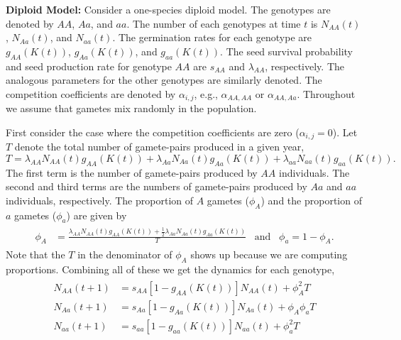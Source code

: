 \documentclass[11pt]{article}
\begin{document}
\noindent \textbf{Diploid Model:} Consider a one-species diploid model.  The genotypes are denoted by $AA$, $Aa$, and $aa$.   The number of each genotypes at time $t$ is $N_{AA}(t)$, $N_{Aa}(t)$, and $N_{aa}(t)$.  The germination rates for each genotype are $g_{AA}(K(t))$, $g_{Aa}(K(t))$, and $g_{aa}(K(t))$.  The seed survival probability and seed production rate for genotype $AA$ are $s_{AA}$ and $\lambda_{AA}$, respectively.  The analogous parameters for the other genotypes are similarly denoted.  The competition coefficients are denoted by $\alpha_{i,j}$, e.g., $\alpha_{AA,AA}$ or $\alpha_{AA,Aa}$.  Throughout we assume that gametes mix randomly in the population.  

First consider the case where the competition coefficients are zero ($\alpha_{i,j}=0$).  Let $T$ denote the total number of gamete-pairs produced in a given year,
\begin{equation}
T = \lambda_{AA}N_{AA}(t)g_{AA}(K(t))+ \lambda_{Aa}N_{Aa}(t)g_{Aa}(K(t))+\lambda_{aa}N_{aa}(t)g_{aa}(K(t)).
\end{equation}
The first term is the number of gamete-pairs produced by $AA$ individuals.  The second and third terms are the numbers of gamete-pairs produced by $Aa$ and $aa$ individuals, respectively. The proportion of $A$ gametes ($\phi_A$) and the proportion of $a$ gametes ($\phi_a$) are given by
\begin{align}\begin{split}
\phi_{A} &= \frac{\lambda_{AA}N_{AA}(t)g_{AA}(K(t))+ \frac{1}{2}\lambda_{Aa}N_{Aa}(t)g_{Aa}(K(t))}{T} \hspace{10pt} \text{and} \hspace{10pt} \phi_a = 1-\phi_{A}.
\end{split}\end{align}
Note that the $T$ in the denominator of $\phi_A$ shows up because we are computing proportions.  Combining all of these we get the dynamics for each genotype,
\begin{align}\begin{split}
N_{AA}(t+1) &= s_{AA}[1-g_{AA}(K(t))]N_{AA}(t) + \phi_A^2T\\
N_{Aa}(t+1) &= s_{Aa}[1-g_{Aa}(K(t))]N_{Aa}(t) + \phi_A\phi_aT\\
N_{aa}(t+1) &= s_{aa}[1-g_{aa}(K(t))]N_{aa}(t) + \phi_a^2T
\end{split}\end{align}
\end{document}
